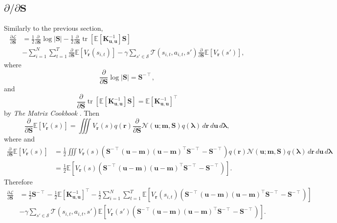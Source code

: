 \documentclass{article}
\theoremstyle{definition}
\DeclareMathOperator{\tr}{tr}
\newcommand{\Kuu}{\mathbf{K}_{\mathbf{u},\mathbf{u}}}
\newcommand{\dS}{\frac{\partial}{\partial\mathbf{S}}}
\begin{document}
\subsection{$\partial/\partial\mathbf{S}$}

Similarly to the previous section,
\[
  \begin{split}
    \frac{\partial\mathcal{L}}{\partial\mathbf{S}} &=
    \frac{1}{2}\dS\log|\mathbf{S}|
    -\frac{1}{2}\dS\tr[\mathbb{E}[\Kuu^{-1}]\mathbf{S}] \\
    &- \sum_{i=1}^N \sum_{t=1}^T \dS\mathbb{E}[V_{\mathbf{r}}(s_{i,t})] -
      \gamma\sum_{s' \in \mathcal{S}} \mathcal{T}(s_{i,t}, a_{i,t},
      s')\dS\mathbb{E}[V_{\mathbf{r}}(s')],
  \end{split}
\]
where
\[ \dS\log|\mathbf{S}| = \mathbf{S}^{-\intercal}, \]
and
\[ \dS\tr[\mathbb{E}[\Kuu^{-1}]\mathbf{S}] = \mathbb{E}[\Kuu^{-1}]^\intercal \]
by \emph{The Matrix Cookbook} \cite{petersen2008matrix}. Then
\[ \dS\mathbb{E}[V_{\mathbf{r}}(s)] = \iiint V_{\mathbf{r}}(s) q(\mathbf{r}) \dS\mathcal{N}(\mathbf{u}; \mathbf{m}, \mathbf{S})
  q(\bm\lambda)\,d\mathbf{r}\,d\mathbf{u}\,d\bm\lambda, \]
where
and
\[
  \begin{split}
    \dS\mathbb{E}[V_{\mathbf{r}}(s)] &= \frac{1}{2}\iiint V_{\mathbf{r}}(s)
    (\mathbf{S}^{-\intercal}(\mathbf{u} - \mathbf{m})(\mathbf{u} -
    \mathbf{m})^\intercal\mathbf{S}^{-\intercal} - \mathbf{S}^{-\intercal})
    q(\mathbf{r}) \mathcal{N}(\mathbf{u};
    \mathbf{m}, \mathbf{S}) q(\bm\lambda)\,d\mathbf{r}\,d\mathbf{u}\,d\bm\lambda
    \\
    &= \frac{1}{2}\mathbb{E}[V_{\mathbf{r}}(s)(\mathbf{S}^{-\intercal}(\mathbf{u} -
    \mathbf{m})(\mathbf{u} - \mathbf{m})^\intercal\mathbf{S}^{-\intercal} -
    \mathbf{S}^{-\intercal})].
  \end{split}
\]
Therefore
\[
  \begin{split}
    \frac{\partial\mathcal{L}}{\partial\mathbf{S}} &=
    \frac{1}{2}\mathbf{S}^{-\intercal} -
    \frac{1}{2}\mathbb{E}[\Kuu^{-1}]^\intercal - \frac{1}{2}
    \sum_{i=1}^N\sum_{t=1}^T
    \mathbb{E}[V_{\mathbf{r}}(s_{i,t})(\mathbf{S}^{-\intercal}(\mathbf{u} -
    \mathbf{m})(\mathbf{u} - \mathbf{m})^\intercal\mathbf{S}^{-\intercal} -
    \mathbf{S}^{-\intercal})] \\
    &- \gamma\sum_{s' \in \mathcal{S}}\mathcal{T}(s_{i,t}, a_{i,t}, s')
    \mathbb{E}[V_{\mathbf{r}}(s')(\mathbf{S}^{-\intercal}(\mathbf{u} -
    \mathbf{m})(\mathbf{u} - \mathbf{m})^\intercal\mathbf{S}^{-\intercal} -
    \mathbf{S}^{-\intercal})].
  \end{split}
\]
\end{document}
